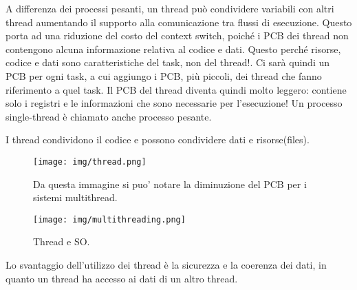 \documentclass{article}
\begin{document}
\noindent{}
\medskip

\noindent A differenza dei processi pesanti, un thread può condividere 
variabili con altri thread aumentando il supporto alla comunicazione tra
flussi di esecuzione. Questo porta ad una riduzione del costo del context 
switch, poiché i PCB dei thread non contengono alcuna informazione relativa
al codice e dati. Questo perché risorse, codice e dati sono caratteristiche 
del task, non del thread!. Ci sarà quindi un PCB per ogni task,
a cui aggiungo i PCB, più piccoli, dei thread che fanno riferimento a quel task.
Il PCB del thread diventa quindi molto leggero: contiene solo i registri e le
informazioni che sono necessarie per l'esecuzione!
Un processo single-thread è chiamato anche processo pesante.

\noindent I thread condividono il codice e possono condividere
dati e risorse(files).

\begin{figure}[h!]
    \begin{center}
        \texttt{[image: img/thread.png]}
        \caption{Da questa immagine si puo' notare
        la diminuzione del PCB per i sistemi multithread.}
    \end{center}
\end{figure}

\begin{figure}[h!]
    \begin{center}
        \texttt{[image: img/multithreading.png]}
        \caption{Thread e SO.}
    \end{center}
\end{figure}

\noindent Lo svantaggio dell'utilizzo dei thread 
è la sicurezza e la coerenza dei dati, in quanto un thread ha accesso ai
dati di un altro thread.
\end{document}
